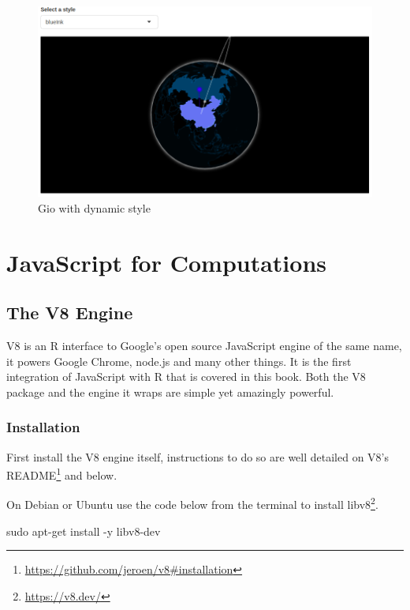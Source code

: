 \documentclass[
]{krantz}
\makeatletter
\newenvironment{Shaded}{\begin{snugshade}}{\end{snugshade}}
\newcommand{\FunctionTok}[1]{\textcolor[rgb]{0,0,0}{#1}}
\newcommand{\NormalTok}[1]{#1}
\renewcommand{\href}[2]{#2\footnote{\url{#1}}}
\newenvironment{kframe}{%
\medskip{}
\setlength{\fboxsep}{.8em}
 \def\at@end@of@kframe{}%
 \ifinner\ifhmode%
  \def\at@end@of@kframe{\end{minipage}}%
  \begin{minipage}{\columnwidth}%
 \fi\fi%
 \def\FrameCommand##1{\hskip\@totalleftmargin \hskip-\fboxsep
 \colorbox{shadecolor}{##1}\hskip-\fboxsep
     \hskip-\linewidth \hskip-\@totalleftmargin \hskip\columnwidth}%
 \MakeFramed {\advance\hsize-\width
   \@totalleftmargin\z@ \linewidth\hsize
   \@setminipage}}%
 {\par\unskip\endMakeFramed%
 \at@end@of@kframe}
\renewenvironment{Shaded}{\begin{kframe}}{\end{kframe}}
\makeatother
\begin{document}
\begin{figure}
\centering
\includegraphics{images/gio-shiny-style.png}
\caption{Gio with dynamic style}
\end{figure}

\hypertarget{part-javascript-for-computations}{%
\part{JavaScript for Computations}\label{part-javascript-for-computations}}

\hypertarget{the-v8-engine}{%
\chapter{The V8 Engine}\label{the-v8-engine}}

V8 is an R interface to Google's open source JavaScript engine of the same name, it powers Google Chrome, node.js and many other things. It is the first integration of JavaScript with R that is covered in this book. Both the V8 package and the engine it wraps are simple yet amazingly powerful.

\hypertarget{installation}{%
\section{Installation}\label{installation}}

First install the V8 engine itself, instructions to do so are well detailed on \href{https://github.com/jeroen/v8\#installation}{V8's README} and below.

On Debian or Ubuntu use the code below from the terminal to install \href{https://v8.dev/}{libv8}.

\begin{Shaded}
\begin{Highlighting}[]
\FunctionTok{sudo}\NormalTok{ apt{-}get install {-}y libv8{-}dev}
\end{Highlighting}
\end{Shaded}
\end{document}
